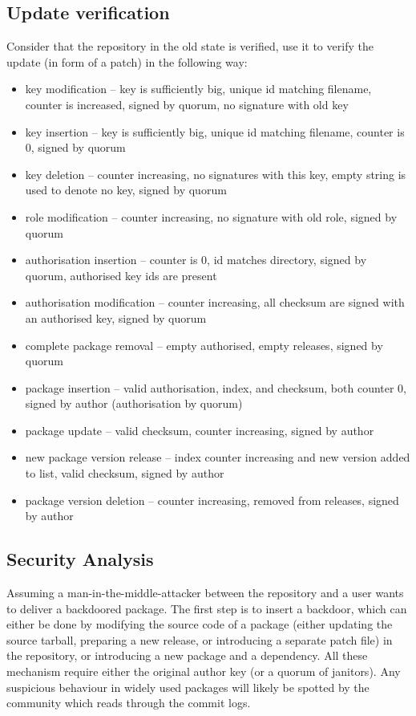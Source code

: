 \documentclass[nocopyrightspace]{sigplanconf}
\begin{document}
\subsection{Update verification}
Consider that the repository in the old state is verified, use it to verify the update (in form of a patch) in the following way:
\begin{itemize}
  \item key modification -- key is sufficiently big, unique id matching filename, counter is increased, signed by quorum, no signature with old key
  \item key insertion -- key is sufficiently big, unique id matching filename, counter is 0, signed by quorum
  \item key deletion -- counter increasing, no signatures with this key, empty string is used to denote no key, signed by quorum
  \item role modification -- counter increasing, no signature with old role, signed by quorum
  \item authorisation insertion -- counter is 0, id matches directory, signed by quorum, authorised key ids are present
  \item authorisation modification -- counter increasing, all checksum are signed with an authorised key, signed by quorum
  \item complete package removal -- empty authorised, empty releases, signed by quorum
  \item package insertion -- valid authorisation, index, and checksum, both counter 0, signed by author (authorisation by quorum)
  \item package update -- valid checksum, counter increasing, signed by author
  \item new package version release -- index counter increasing and new version added to list, valid checksum, signed by author
  \item package version deletion -- counter increasing, removed from releases, signed by author
\end{itemize}

\subsection{Security Analysis}
Assuming a man-in-the-middle-attacker between the repository and a user wants to deliver a backdoored package.
The first step is to insert a backdoor, which can either be done by modifying the source code of a package (either updating the source tarball, preparing a new release, or introducing a separate patch file) in the repository, or introducing a new package and a dependency.
All these mechanism require either the original author key (or a quorum of janitors).
Any suspicious behaviour in widely used packages will likely be spotted by the community which reads through the commit logs.
\end{document}
